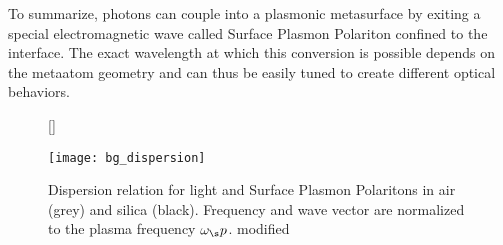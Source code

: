 \indent
To summarize, photons can couple into a plasmonic metasurface by exiting a special electromagnetic wave called Surface Plasmon Polariton confined to the interface. The exact wavelength at which this conversion is possible depends on the metaatom geometry and can thus be easily tuned to create different optical behaviors.

\begin{figure}[H]
    [\FBwidth]
    {\caption{
        Dispersion relation for light and Surface Plasmon Polaritons in air (grey) and silica (black). Frequency and wave vector are normalized to the plasma frequency $\omega_\s p$. \cite{Maier2007} modified
    }
    \label{fig:bg:dispersion}}
    {\texttt{[image: bg\_dispersion]}}
\end{figure}